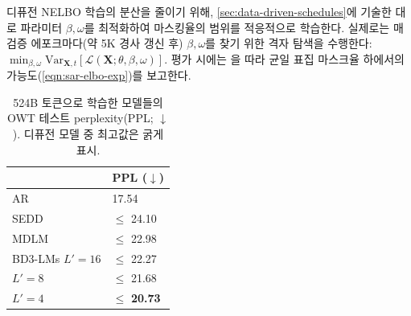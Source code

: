 \documentclass{article} %
\newcommand{\vkl}[1]{\textcolor{blue}{[VK: #1]}}
\def\algos{BD3-LMs}
\def\owt{OWT}
\begin{document}
디퓨전 NELBO 학습의 분산을 줄이기 위해, \cref{sec:data-driven-schedules}에 기술한 대로 파라미터 $\beta, \omega$를 최적화하여 마스킹율의 범위를 적응적으로 학습한다. 실제로는 매 검증 에포크마다(약 5K 경사 갱신 후) $\beta, \omega$를 찾기 위한 격자 탐색을 수행한다: $\min_{\beta, \omega} \text{Var}_{\mathbf{X}, t} \left[ \mathcal{L}(\mathbf{X}; \theta, \beta, \omega) \right]$. 평가 시에는 \citet{austin2021structured, sahoo2024simple}을 따라 균일 표집 마스크율 하에서의 가능도(\ref{eqn:sar-elbo-exp})를 보고한다.

\begin{table}
\vspace{-10pt}
\small
\centering
    \caption{524B 토큰으로 학습한 모델들의 \owt{} 테스트 perplexity(PPL; $\downarrow$). 디퓨전 모델 중 최고값은 굵게 표시.}\label{owt-ppl}
  \begin{tabular}{ll}
    \toprule
    & PPL ($\downarrow$) \\
    \midrule
    AR~\citep{sahoo2024simple} & 17.54 \\
    \midrule
    SEDD~\citep{lou2024discrete} & $\leq$ 24.10 \\
    MDLM~\citep{sahoo2024simple} & $\leq$ 22.98 \\
    \midrule
    \algos{} $L'=16$ & $\leq$ 22.27 \\
    \hspace{4.3em}$L'=8$ & $\leq$ 21.68  \\
    \hspace{4.3em}$L'=4$ & $\leq$ \textbf{20.73} \\
    \bottomrule
  \end{tabular}
\vspace{-15pt}
\end{table}

\end{document}
